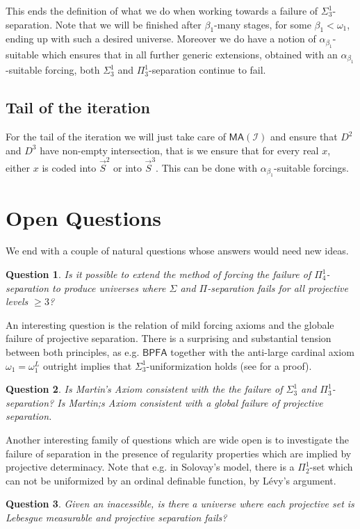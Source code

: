 \documentclass[a4paper,11pt]{article}
\newtheorem{question}{Question}
\newcommand{\BPFA}{\mathsf{BPFA}}
\begin{document}
{This ends the definition of what we do when working towards a failure of $\Sigma^1_3$-separation. Note that we will be finished after $\beta_1$-many stages, for some $\beta_1 <\omega_1$, ending up with such a desired universe. Moreover we do have a notion of $\alpha_{\beta_1}$-suitable which ensures that in all further generic extensions, obtained with an $\alpha_{\beta_1}$-suitable forcing, both $\Sigma^1_3$ and $\Pi^1_3$-separation continue to fail.

\subsection{Tail of the iteration}

For the tail of the iteration we will just take care of $\mathsf{MA} (\mathcal{I})$ and ensure that $D^2$ and $D^3$ have non-empty intersection, that is we ensure that for every real $x$, either $x$ is coded into $\vec{S}^2$ or into $\vec{S}^3$.
This can be done with  $\alpha_{\beta_1}$-suitable forcings. 


\section{Open Questions}

We end with a couple of natural questions whose answers would need new ideas.



\begin{question}
Is it possible to extend the method of forcing the failure of $\Pi^1_4$-separation to produce universes where $\Sigma$ and $\Pi$-separation fails for all projective levels $\ge 3$?
\end{question}
An interesting question is the relation of mild forcing axioms and the globale failure of projective separation. There is a surprising and substantial tension between both principles, as e.g. $\BPFA$ together with the anti-large cardinal axiom $\omega_1=\omega_1^L$ outright implies that $\Sigma^1_3$-uniformization holds (see \cite{Ho3} for a proof). 
\begin{question}
Is Martin's Axiom consistent with the the  failure of $\Sigma^1_3$ and $\Pi^1_3$-separation? Is Martin;s Axiom consistent with a global failure of projective separation.
\end{question}
Another interesting family of questions which are wide open is to investigate the failure of separation in the presence of regularity properties which are implied by projective determinacy. Note that e.g. in Solovay's model, there is a $\Pi^1_2$-set which can not be uniformized by an ordinal definable function, by L\'evy's argument.
\begin{question}
Given an inacessible, is there a universe where each projective set is Lebesgue measurable and projective separation fails?
\end{question}








}
\end{document}

